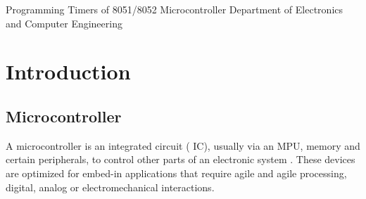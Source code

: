 \documentclass{article}
\begin{document}
{Programming Timers of 8051/8052 Microcontroller}
{Department of Electronics and Computer Engineering}




\tableofcontents
\pagebreak
\listoffigures
\pagebreak
\lstlistoflistings
\pagebreak
{}
\section{Introduction}
\subsection{Microcontroller}

A microcontroller is an integrated circuit ( IC), usually via an MPU, memory and certain peripherals, to control other parts of an electronic system .
These devices are optimized for embed-in applications that require agile and agile processing, digital, analog or electromechanical interactions.
\end{document}
